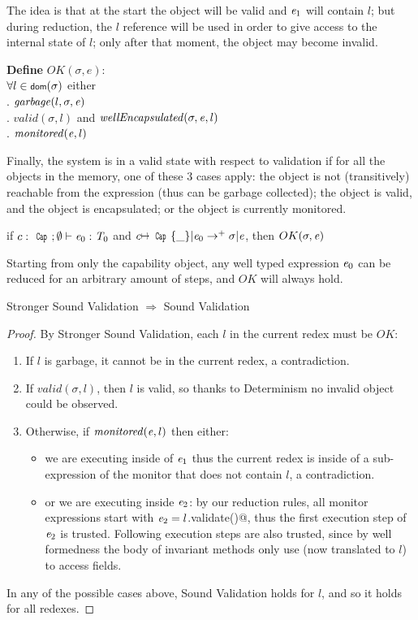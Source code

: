 The idea is that at the start the object will be valid and ${\mathit{e}}_1$ will contain $l$;
but during reduction, the $l$ reference will be used in order to
give access to the internal state of $l$; only after that moment, the object may become invalid.


\noindent\textbf{Define} $OK(\sigma,e)$:\\
\indent $\forall l\in\dom(\sigma)$
  either\\
\indent{}. $\mathit{garbage}(l,\sigma,\e)$\\
\indent{}. $\mathit{valid}(\sigma,l)$ and $\mathit{wellEncapsulated}(\sigma,\e,l)$\\
\indent{}. $\mathit{monitored}({\mathit{e}},l)$

Finally, the system is in a valid state with respect to validation
if for all the objects in the memory, one of these 3 cases apply:
the object is not (transitively) reachable from the expression (thus can be garbage collected);
the object is valid, and the object is encapsulated;
or the object is currently monitored.

\begin{theorem}
if $c:\Kw{Cap};\emptyset\vdash \e_0: \T_0$ and
$c\mapsto\Kw{Cap}\{\_\}|\e_0\rightarrow^+ \sigma|\e$, then
$OK(\sigma,\e)$
\end{theorem}
\noindent Starting from only the capability object,
any well typed expression ${\mathit{e}}_0$ can be reduced for an arbitrary amount of steps,
and $OK$ will always hold.
\\
\begin{theorem} Stronger Sound Validation $\Rightarrow$ Sound Validation
\end{theorem}
\begin{proof}
\noindent By Stronger Sound Validation, each $l$ in the current redex must be $OK$:
\begin{enumerate}
	\item If $l$ is garbage, it cannot be in the current redex, a contradiction.
	\item If $\mathit{valid}(\sigma,l)$, then $l$ is valid, so thanks to Determinism
	no invalid object could be observed.
	\item Otherwise, if $\mathit{monitored}({\mathit{e}},l)$ then either:
	\begin{itemize}
	 \item we are executing inside of ${\mathit{e}}_1$ thus the current redex is inside of a sub-expression of the monitor that does not contain $l$, a contradiction.
	 \item or we are executing inside ${\mathit{e}}_2$:
	 by our reduction rules, all monitor expressions start with
	 ${\mathit{e}}_2=l$\Q@.validate()@, thus the first execution step
	 of ${\mathit{e}}_2$ is trusted. Following execution steps are also trusted, since by well formedness the body of invariant methods only use \Q@this@ (now translated to $l$) to access fields.
	\end{itemize}
\end{enumerate}
In any of the possible cases above, Sound Validation holds for $l$, and so it holds for all redexes.
\end{proof}

